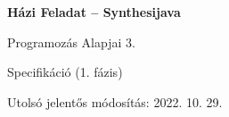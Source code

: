 
\begin{titlepage}
    \begin{center}
        \vspace*{1cm}
            
        \Huge
        \textbf{Házi Feladat – Synthesijava}
            
        \vspace{0.5cm}
        \LARGE
        Programozás Alapjai 3.
            
        \vspace{2.5cm}
            
            
        \vfill
            
        Specifikáció (1. fázis)
            
        \vspace{0.8cm}
            
            
        \Large
        Utolsó jelentős módosítás: 2022. 10. 29.
        \vspace*{1cm}
            
    \end{center}
\end{titlepage}
